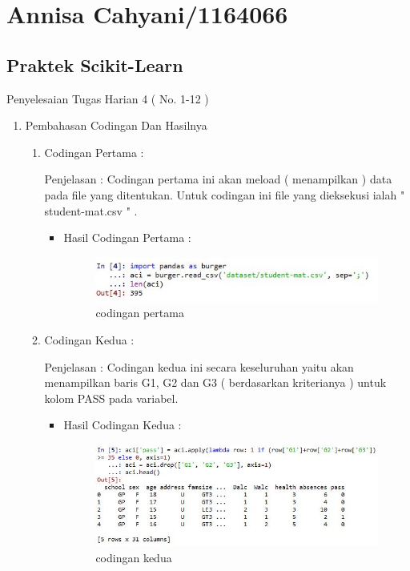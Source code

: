 \section{Annisa Cahyani/1164066}
\subsection{Praktek Scikit-Learn}
Penyelesaian Tugas Harian 4 ( No. 1-12 )
\begin{enumerate}
\item Pembahasan Codingan Dan Hasilnya
\begin{enumerate}
\item Codingan Pertama :
\par Penjelasan : Codingan pertama ini akan meload ( menampilkan ) data pada file yang ditentukan. Untuk codingan ini file yang dieksekusi ialah " student-mat.csv " . 
\par
\begin{itemize}
\par
\item Hasil Codingan Pertama :
\par

\begin{figure}[ht]
\centering
\includegraphics[scale=0.6]{figures/hasil1.jpg}
\caption{codingan pertama}
\label{contoh}
\end{figure}

\par
\end{itemize}
\item Codingan Kedua :
\par Penjelasan : Codingan kedua ini secara keseluruhan yaitu akan menampilkan  baris  G1, G2 dan G3 ( berdasarkan kriterianya ) untuk kolom PASS pada variabel.
\par 
\begin{itemize}
\par
\item Hasil Codingan Kedua :

\begin{figure}[ht]
\centering
\includegraphics[scale=0.6]{figures/hasil2.jpg}
\caption{codingan kedua}
\label{contoh}
\end{figure}


\end{itemize}
\end{enumerate}
\end{enumerate}
